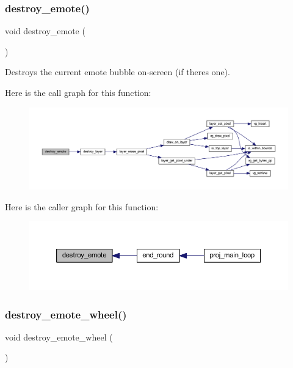 \subsubsection{\texorpdfstring{destroy\+\_\+emote()}{destroy\_emote()}}
{\footnotesize\ttfamily void destroy\+\_\+emote (\begin{DoxyParamCaption}{ }\end{DoxyParamCaption})}



Destroys the current emote bubble on-\/screen (if there\textquotesingle{}s one). 

Here is the call graph for this function\+:\nopagebreak
\begin{figure}[H]
\begin{center}
\leavevmode
\includegraphics[width=350pt]{group__emote_ga955eff65036e00685619117d7bb9a228_cgraph}
\end{center}
\end{figure}
Here is the caller graph for this function\+:\nopagebreak
\begin{figure}[H]
\begin{center}
\leavevmode
\includegraphics[width=350pt]{group__emote_ga955eff65036e00685619117d7bb9a228_icgraph}
\end{center}
\end{figure}
\mbox{\label{group__emote_ga96db30bf99d18ac5410e84902ac4004b}} 
\subsubsection{\texorpdfstring{destroy\+\_\+emote\+\_\+wheel()}{destroy\_emote\_wheel()}}
{\footnotesize\ttfamily void destroy\+\_\+emote\+\_\+wheel (\begin{DoxyParamCaption}{ }\end{DoxyParamCaption})}



